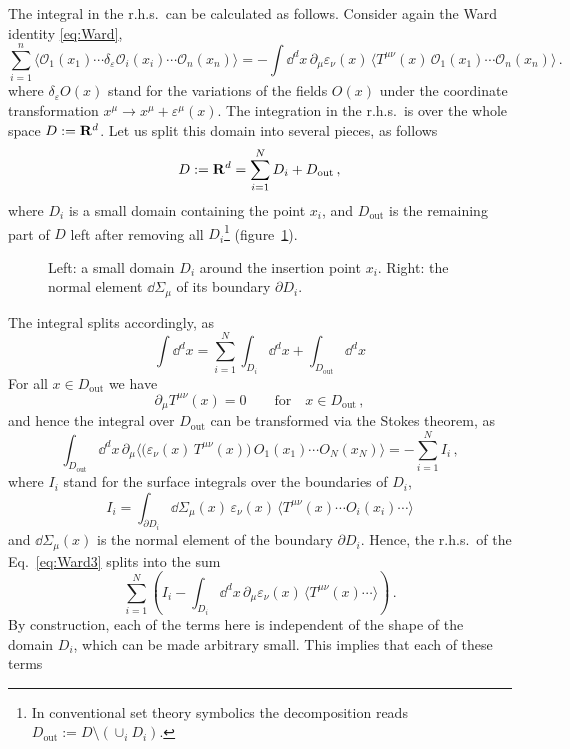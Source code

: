 The integral in the r.h.s.\ can be calculated as follows. Consider again the Ward
identity \eqref{eq:Ward},
\begin{equation}\label{eq:Ward3}
\sum_{i=1}^n\bigl\langle\mathcal O_1(x_1)\cdots\delta_\varepsilon\mathcal O_i(x_i)\cdots\mathcal O_n(x_n)\bigr\rangle
=-\int \dd^dx\,\partial_\mu\varepsilon_\nu(x)\,\bigl\langle T^{\mu\nu}(x)\,\mathcal O_1(x_1)\cdots\mathcal O_n(x_n)\bigr\rangle\,.
\end{equation}
where $\delta_\varepsilon O(x)$ stand for the variations of the fields $O(x)$ under
the coordinate transformation $x^\mu\to x^\mu+\varepsilon^\mu(x)$. The integration
in the r.h.s.\ is over the whole space $D:=\mathbf{R}^d$. Let us split this domain into
several pieces, as follows
\[
D:=\mathbf{R}^d=\sum_{i=1}^ND_i+D_{\text{out}}\,,
\]
where $D_i$ is a small domain containing the point $x_i$, and $D_{\text{out}}$ is
the remaining part of $D$ left after removing all $D_i$\footnote{In conventional
set theory symbolics the decomposition reads
$D_{\text{out}}:=D\setminus(\cup_iD_i)$.} (figure~\ref{fig:Di}).
\begin{figure}[ht]
\centering{}
\caption{Left: a small domain $D_i$ around the insertion point $x_i$. Right: the
normal element $\dd\Sigma_\mu$ of its boundary $\partial D_i$.}
\label{fig:Di}
\end{figure}
The integral splits accordingly, as
\[
\int \dd^dx=\sum_{i=1}^N\int_{D_i}\dd^dx+\int_{D_{\text{out}}}\dd^dx
\]
For all $x\in D_{\text{out}}$ we have
\[
\partial_\mu T^{\mu\nu}(x)=0\qquad\text{for}\quad x\in D_{\text{out}}\,,
\]
and hence the integral over $D_{\text{out}}$ can be transformed via the Stokes
theorem, as
\[
\int_{D_{\text{out}}}\dd^dx\,\partial_\mu\bigl\langle\bigl(\varepsilon_\nu(x)\,T^{\mu\nu}(x)\bigr)\,O_1(x_1)\cdots O_N(x_N)\bigr\rangle=-\sum_{i=1}^NI_i\,,
\]
where $I_i$ stand for the surface integrals over the boundaries of $D_i$,
\[
I_i=\int_{\partial D_i}\dd\Sigma_\mu(x)\,\varepsilon_\nu(x)\,\bigl\langle T^{\mu\nu}(x)\cdots O_i(x_i)\cdots\bigr\rangle
\]
and $\dd\Sigma_\mu(x)$ is the normal element of the boundary $\partial D_i$. Hence,
the r.h.s.\ of the Eq.~\eqref{eq:Ward3} splits into the sum
\begin{equation}\label{eq:splitsum}
\sum_{i=1}^N\left(I_i-\int_{D_i}\dd^dx\,\partial_\mu\varepsilon_\nu(x)\,\bigl\langle T^{\mu\nu}(x)\cdots\bigr\rangle\right)\,.
\end{equation}
By construction, each of the terms here is independent of the shape of the domain
$D_i$, which can be made arbitrary small. This implies that each of these terms
